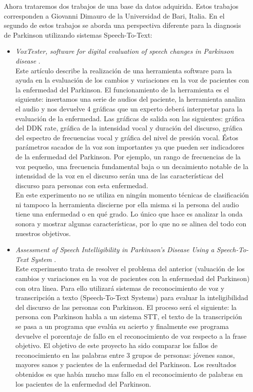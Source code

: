 Ahora trataremos dos trabajos de una base da datos adquirida. Estos trabajos corresponden a Giovanni Dimauro de la Universidad de Bari, Italia. En el segundo de estos trabajos se aborda una perspectiva diferente para la diagnosis de Parkinson utilizando sistemas Speech-To-Text:
\begin{itemize}
	\item \textit{VoxTester, software for digital evaluation of speech changes in Parkinson disease} \cite{giovanni1}.\\
	Este artículo describe la realización de una herramienta software para la ayuda en la evaluación de los cambios y variaciones en la voz de pacientes con la enfermedad del Parkinson. El funcionamiento de la herramienta es el siguiente: insertamos una serie de audios del paciente, la herramienta analiza el audio y nos devuelve 4 gráficas que un experto deberá interpretar para la evaluación de la enfermedad. Las gráficas de salida son las siguientes: gráfica del DDK rate, gráfica de la intensidad vocal y duración del discurso, gráfica del espectro de frecuencias vocal y gráfica del nivel de presión vocal. Éstos parámetros sacados de la voz son importantes ya que pueden ser indicadores de la enfermedad del Parkinson. Por ejemplo, un rango de frecuencias de la voz pequeño, una frecuencia fundamental baja o un decaimiento notable de la intensidad de la voz en el discurso serán una de las características del discurso para personas con esta enfermedad.\\
	En este experimento no se utiliza en ningún momento técnicas de clasificación ni tampoco la herramienta discierne por ella misma si la persona del audio tiene una enfermedad o en qué grado. Lo único que hace es analizar la onda sonora y mostrar algunas características, por lo que no se alinea del todo con nuestros objetivos.
	\item \textit{Assessment of Speech Intelligibility in Parkinson’s Disease Using a Speech-To-Text System} \cite{giovanni2}.\\
	Este experimento trata de resolver el problema del anterior (valuación de los cambios y variaciones en la voz de pacientes con la enfermedad del Parkinson) con otra línea. Para ello utilizará sistemas de reconocimiento de voz y transcripción a texto (Speech-To-Text Systems) para evaluar la inteligibilidad del discurso de las personas con Parkinson. El proceso será el siguiente: la persona con Parkinson habla a un sistema STT, el texto de la transcripción se pasa a un programa que evalúa su acierto y finalmente ese programa devuelve el porcentaje de fallo en el reconocimiento de voz respecto a la frase objetivo. El objetivo de este proyecto ha sido comparar los fallos de reconocimiento en las palabras entre 3 grupos de personas: jóvenes sanos, mayores sanos y pacientes de la enfermedad del Parkinson. Los resultados obtenidos es que había mucho mas fallo en el reconocimiento de palabras en los pacientes de la enfermedad del Parkinson.
	
\end{itemize}

